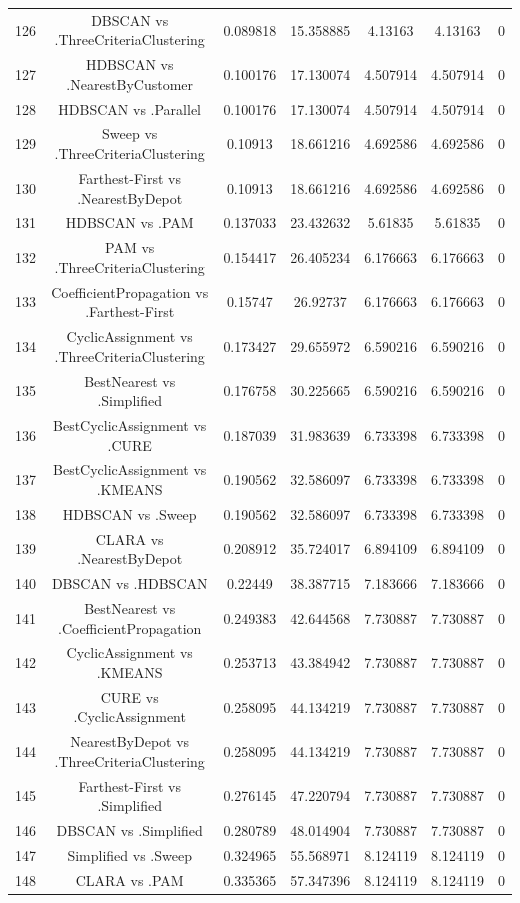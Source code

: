 \documentclass[a4paper,10pt]{article}
\begin{document}
\begin{landscape}
\begin{table}[!htp]
\begin{tabular}{ccccccc}
126&DBSCAN vs .ThreeCriteriaClustering&0.089818&15.358885&4.13163&4.13163&0\\
127&HDBSCAN vs .NearestByCustomer&0.100176&17.130074&4.507914&4.507914&0\\
128&HDBSCAN vs .Parallel&0.100176&17.130074&4.507914&4.507914&0\\
129&Sweep vs .ThreeCriteriaClustering&0.10913&18.661216&4.692586&4.692586&0\\
130&Farthest-First vs .NearestByDepot&0.10913&18.661216&4.692586&4.692586&0\\
131&HDBSCAN vs .PAM&0.137033&23.432632&5.61835&5.61835&0\\
132&PAM vs .ThreeCriteriaClustering&0.154417&26.405234&6.176663&6.176663&0\\
133&CoefficientPropagation vs .Farthest-First&0.15747&26.92737&6.176663&6.176663&0\\
134&CyclicAssignment vs .ThreeCriteriaClustering&0.173427&29.655972&6.590216&6.590216&0\\
135&BestNearest vs .Simplified&0.176758&30.225665&6.590216&6.590216&0\\
136&BestCyclicAssignment vs .CURE&0.187039&31.983639&6.733398&6.733398&0\\
137&BestCyclicAssignment vs .KMEANS&0.190562&32.586097&6.733398&6.733398&0\\
138&HDBSCAN vs .Sweep&0.190562&32.586097&6.733398&6.733398&0\\
139&CLARA vs .NearestByDepot&0.208912&35.724017&6.894109&6.894109&0\\
140&DBSCAN vs .HDBSCAN&0.22449&38.387715&7.183666&7.183666&0\\
141&BestNearest vs .CoefficientPropagation&0.249383&42.644568&7.730887&7.730887&0\\
142&CyclicAssignment vs .KMEANS&0.253713&43.384942&7.730887&7.730887&0\\
143&CURE vs .CyclicAssignment&0.258095&44.134219&7.730887&7.730887&0\\
144&NearestByDepot vs .ThreeCriteriaClustering&0.258095&44.134219&7.730887&7.730887&0\\
145&Farthest-First vs .Simplified&0.276145&47.220794&7.730887&7.730887&0\\
146&DBSCAN vs .Simplified&0.280789&48.014904&7.730887&7.730887&0\\
147&Simplified vs .Sweep&0.324965&55.568971&8.124119&8.124119&0\\
148&CLARA vs .PAM&0.335365&57.347396&8.124119&8.124119&0\\

\end{tabular}
\end{table}
\end{landscape}
\end{document}
